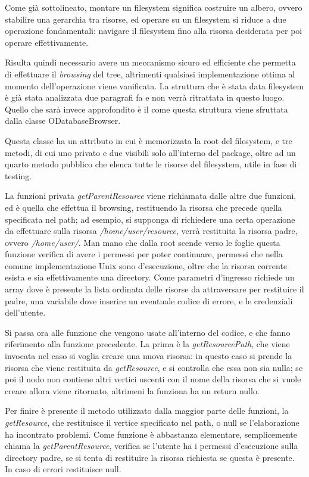 Come già sottolineato, montare un filesystem significa costruire un albero, ovvero stabilire una gerarchia tra risorse, ed operare su un filesystem si riduce a due operazione fondamentali: navigare il filesystem fino alla risorsa desiderata per poi operare effettivamente.

Risulta quindi necessario avere un meccanismo sicuro ed efficiente che permetta di effettuare il \emph{browsing} del tree, altrimenti qualsiasi implementazione ottima al momento dell'operazione viene vanificata. La struttura che è stata data filesystem è già stata analizzata due paragrafi fa e non verrà ritrattata in questo luogo. Quello che sarà invece approfondito è il come questa struttura viene sfruttata dalla classe ODatabaseBrowser. 

Questa classe ha un attributo in cui è memorizzata la root del filesystem, e tre metodi, di cui uno privato e due visibili solo all'interno del package, oltre ad un quarto metodo pubblico che elenca tutte le risorse del filesystem, utile in fase di testing. 

La funzioni privata \emph{getParentResource} viene richiamata dalle altre due funzioni, ed è quella che effettua il browsing, restituendo la risorsa che precede quella specificata nel path; ad esempio, si supponga di richiedere una certa operazione da effettuare sulla risorsa \emph{/home/user/resource}, verrà restituita la risorsa padre, ovvero \emph{/home/user/}. Man mano che dalla root scende verso le foglie questa funzione verifica di avere i permessi per poter continuare, permessi che nella comune implementazione Unix sono d'esecuzione, oltre che la risorsa corrente esista e sia effettivamente una directory. Come parametri d'ingresso richiede un array dove è presente la lista ordinata delle risorse da attraversare per restituire il padre, una variabile dove inserire un eventuale codice di errore, e le credenziali dell'utente.

Si passa ora alle funzione che vengono usate all'interno del codice, e che fanno riferimento alla funzione precedente. La prima è la \emph{getResourcePath}, che viene invocata nel caso si voglia creare una nuova risorsa: in questo caso si prende la risorsa che viene restituita da \emph{getResource}, e si controlla che essa non sia nulla; se poi il nodo non contiene altri vertici uscenti con il nome della risorsa che si vuole creare allora viene ritornato, altrimeni la funziona ha un return nullo. 

Per finire è presente il metodo utilizzato dalla maggior parte delle funzioni, la \emph{getResource}, che restituisce il vertice specificato nel path, o null se l'elaborazione ha incontrato problemi. Come funzione è abbastanza elementare, semplicemente chiama la \emph{getParentResource}, verifica se l'utente ha i permessi d'esecuzione sulla directory padre, se si tenta di restituire la risorsa richiesta se questa è presente. In caso di errori restituisce null.

